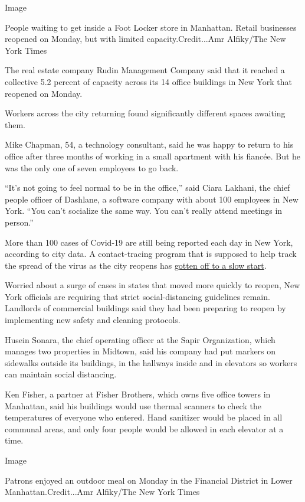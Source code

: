 Image

People waiting to get inside a Foot Locker store in Manhattan. Retail
businesses reopened on Monday, but with limited capacity.Credit...Amr
Alfiky/The New York Times

The real estate company Rudin Management Company said that it reached a
collective 5.2 percent of capacity across its 14 office buildings in New
York that reopened on Monday.

Workers across the city returning found significantly different spaces
awaiting them.

Mike Chapman, 54, a technology consultant, said he was happy to return
to his office after three months of working in a small apartment with
his fiancée. But he was the only one of seven employees to go back.

``It's not going to feel normal to be in the office,'' said Ciara
Lakhani, the chief people officer of Dashlane, a software company with
about 100 employees in New York. ``You can't socialize the same way. You
can't really attend meetings in person.''

More than 100 cases of Covid-19 are still being reported each day in New
York, according to city data. A contact-tracing program that is supposed
to help track the spread of the virus as the city reopens has
\href{https://www.nytimes3xbfgragh.onion/2020/06/21/nyregion/nyc-contact-tracing.html}{gotten
off to a slow start}.

Worried about a surge of cases in states that moved more quickly to
reopen, New York officials are requiring that strict social-distancing
guidelines remain. Landlords of commercial buildings said they had been
preparing to reopen by implementing new safety and cleaning protocols.

Husein Sonara, the chief operating officer at the Sapir Organization,
which manages two properties in Midtown, said his company had put
markers on sidewalks outside its buildings, in the hallways inside and
in elevators so workers can maintain social distancing.

Ken Fisher, a partner at Fisher Brothers, which owns five office towers
in Manhattan, said his buildings would use thermal scanners to check the
temperatures of everyone who entered. Hand sanitizer would be placed in
all communal areas, and only four people would be allowed in each
elevator at a time.

Image

Patrons enjoyed an outdoor meal on Monday in the Financial District in
Lower Manhattan.Credit...Amr Alfiky/The New York Times

